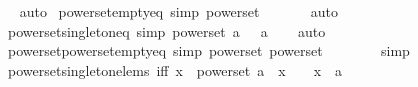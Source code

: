 \begin{isabellebody}
\isadelimproof
\ %
\endisadelimproof
%
\isatagproof
{}\isamarkupfalse%
\ auto%
\endisatagproof
{\isafoldproof}%
%
\isadelimproof
%
\endisadelimproof
\isanewline
\isanewline
{}\isamarkupfalse%
\ powerset{\isacharunderscore}{\kern0pt}empty{\isacharunderscore}{\kern0pt}eq\ {\isacharbrackleft}{\kern0pt}simp{\isacharbrackright}{\kern0pt}{\isacharcolon}{\kern0pt}\ {\isachardoublequoteopen}powerset\ {\isacharbraceleft}{\kern0pt}{\isacharbraceright}{\kern0pt}\ {\isacharequal}{\kern0pt}\ {\isacharbraceleft}{\kern0pt}{\isacharbraceleft}{\kern0pt}{\isacharbraceright}{\kern0pt}{\isacharbraceright}{\kern0pt}{\isachardoublequoteclose}\isanewline
%
\isadelimproof
\ \ %
\endisadelimproof
%
\isatagproof
{}\isamarkupfalse%
\ auto%
\endisatagproof
{\isafoldproof}%
%
\isadelimproof
\isanewline
%
\endisadelimproof
\isanewline
{}\isamarkupfalse%
\ powerset{\isacharunderscore}{\kern0pt}singleton{\isacharunderscore}{\kern0pt}eq\ {\isacharbrackleft}{\kern0pt}simp{\isacharbrackright}{\kern0pt}{\isacharcolon}{\kern0pt}\ {\isachardoublequoteopen}powerset\ {\isacharbraceleft}{\kern0pt}a{\isacharbraceright}{\kern0pt}\ {\isacharequal}{\kern0pt}\ {\isacharbraceleft}{\kern0pt}{\isacharbraceleft}{\kern0pt}{\isacharbraceright}{\kern0pt}{\isacharcomma}{\kern0pt}\ {\isacharbraceleft}{\kern0pt}a{\isacharbraceright}{\kern0pt}{\isacharbraceright}{\kern0pt}{\isachardoublequoteclose}\isanewline
%
\isadelimproof
\ \ %
\endisadelimproof
%
\isatagproof
{}\isamarkupfalse%
\ auto%
\endisatagproof
{\isafoldproof}%
%
\isadelimproof
\isanewline
%
\endisadelimproof
\isanewline
{}\isamarkupfalse%
\ powerset{\isacharunderscore}{\kern0pt}powerset{\isacharunderscore}{\kern0pt}empty{\isacharunderscore}{\kern0pt}eq\ {\isacharbrackleft}{\kern0pt}simp{\isacharbrackright}{\kern0pt}{\isacharcolon}{\kern0pt}\ {\isachardoublequoteopen}powerset\ {\isacharparenleft}{\kern0pt}powerset\ {\isacharbraceleft}{\kern0pt}{\isacharbraceright}{\kern0pt}{\isacharparenright}{\kern0pt}\ {\isacharequal}{\kern0pt}\ {\isacharbraceleft}{\kern0pt}{\isacharbraceleft}{\kern0pt}{\isacharbraceright}{\kern0pt}{\isacharcomma}{\kern0pt}\ {\isacharbraceleft}{\kern0pt}{\isacharbraceleft}{\kern0pt}{\isacharbraceright}{\kern0pt}{\isacharbraceright}{\kern0pt}{\isacharbraceright}{\kern0pt}{\isachardoublequoteclose}\isanewline
%
\isadelimproof
\ \ %
\endisadelimproof
%
\isatagproof
{}\isamarkupfalse%
\ simp%
\endisatagproof
{\isafoldproof}%
%
\isadelimproof
\isanewline
%
\endisadelimproof
\isanewline
{}\isamarkupfalse%
\ powerset{\isacharunderscore}{\kern0pt}singleton{\isacharunderscore}{\kern0pt}elems\ {\isacharbrackleft}{\kern0pt}iff{\isacharbrackright}{\kern0pt}{\isacharcolon}{\kern0pt}\ {\isachardoublequoteopen}x\ {\isasymin}\ powerset\ {\isacharbraceleft}{\kern0pt}a{\isacharbraceright}{\kern0pt}\ {\isasymlongleftrightarrow}\ x\ {\isacharequal}{\kern0pt}\ {\isacharbraceleft}{\kern0pt}{\isacharbraceright}{\kern0pt}\ {\isasymor}\ x\ {\isacharequal}{\kern0pt}\ {\isacharbraceleft}{\kern0pt}a{\isacharbraceright}{\kern0pt}{\isachardoublequoteclose}\isanewline

\end{isabellebody}
